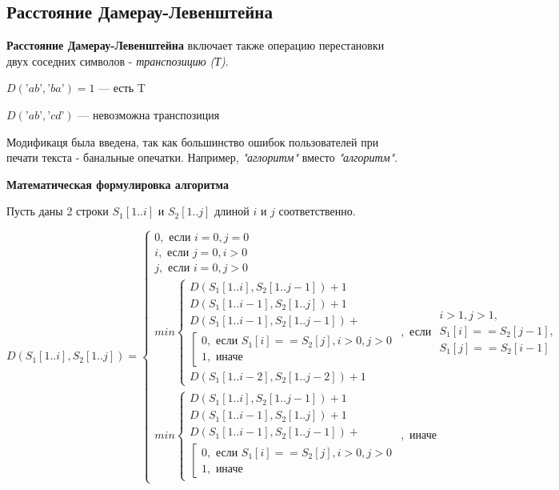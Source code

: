 \documentclass[a4paper,12pt]{article}
\begin{document}
\subsection{Расстояние Дамерау-Левенштейна}%

\textbf{Расстояние Дамерау-Левенштейна} включает также операцию перестановки двух соседних символов - \textit{транспозицию (Т)}.
\vspace{\baselineskip}

$D(\text{'}ab\text{'},\text{'}ba\text{'})=1$ — есть T

$D(\text{'}ab\text{'},\text{'}cd\text{'})$ — невозможна транспозиция

\vspace{\baselineskip}

Модификаця была введена, так как большинство ошибок пользователей при печати текста - банальные опечатки. Например, \textit{"аглоритм"} вместо \textit{"алгоритм"}.

\clearpage

\textbf{Математическая формулировка алгоритма}

Пусть даны 2 строки $S_1[1..i]$ и $S_2[1..j]$ длиной $i$ и $j$ соответственно.

\begin{equation*}
	D(S_1[1..i],S_2[1..j]) =
	\begin{cases}
	0,\text{ если }i=0,j=0
\\
i,\text{ если }j=0, i>0
\\
j,\text{ если }i=0, j>0
\\
		min
		\begin{cases}
			D(S_1[1..i],S_2[1..j-1])+1
			\\
			D(S_1[1..i-1],S_2[1..j])+1
			\\
			D(S_1[1..i-1],S_2[1..j-1])+
			\\
			\left[
			\begin{gathered}
				0,\text{ если }S_1[i]==S_2[j],i>0,j>0
				\\
				1,\text{ иначе}
			\end{gathered}
			\right.
			\\
			D(S_1[1..i-2],S_2[1..j-2])+1
		\end{cases},
	\text{ если }\begin{gathered}i>1,j>1,\\
		S_1[i]==S_2[j-1],\\
		S_1[j]==S_2[i-1]\end{gathered}
	\\min
			\begin{cases}
		D(S_1[1..i],S_2[1..j-1])+1
		\\
		D(S_1[1..i-1],S_2[1..j])+1
		\\
		D(S_1[1..i-1],S_2[1..j-1])+
		\\
		\left[
		\begin{gathered}
			0,\text{ если }S_1[i]==S_2[j],i>0,j>0
			\\
			1,\text{ иначе}
		\end{gathered}
		\right.
		\end{cases},
	\text{ иначе}
	\end{cases}
\end{equation*}
\vspace{\baselineskip}
\end{document}
